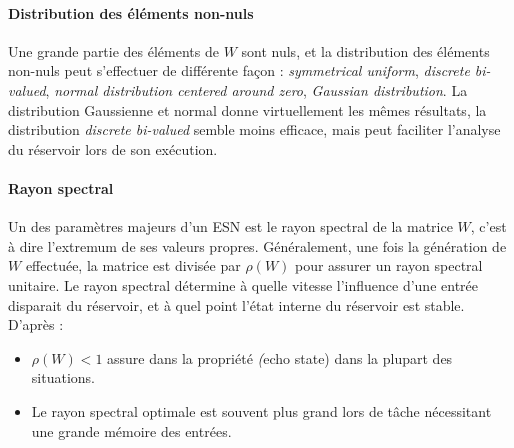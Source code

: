\documentclass[12pt]{article}
\begin{document}
\paragraph{Distribution des éléments non-nuls}
Une grande partie des éléments de $W$ sont nuls, et la distribution des éléments non-nuls peut s'effectuer de différente façon : \textit{symmetrical uniform}, \textit{discrete bi-valued}, \textit{normal distribution centered around zero}, \textit{Gaussian distribution}.\newline
La distribution Gaussienne et normal donne virtuellement les mêmes résultats, la distribution \textit{discrete bi-valued} semble moins efficace, mais peut faciliter l'analyse du réservoir lors de son exécution.

\paragraph{Rayon spectral}
Un des paramètres majeurs d'un ESN est le rayon spectral de la matrice $W$, c'est à dire l'extremum de ses valeurs propres. Généralement, une fois la génération de $W$ effectuée, la matrice est divisée par $\rho(W)$ pour assurer un rayon spectral unitaire. Le rayon spectral détermine à quelle vitesse l'influence d'une entrée disparait du réservoir, et à quel point l'état interne du réservoir est stable.\newline
D'après \cite{Lukosevicius12}:
\begin{itemize}
\item $\rho(W) < 1$ assure dans la propriété \textit(echo state) dans la plupart des situations.
\item Le rayon spectral optimale est souvent plus grand lors de tâche nécessitant une grande mémoire des entrées.
\end{itemize}
\end{document}
